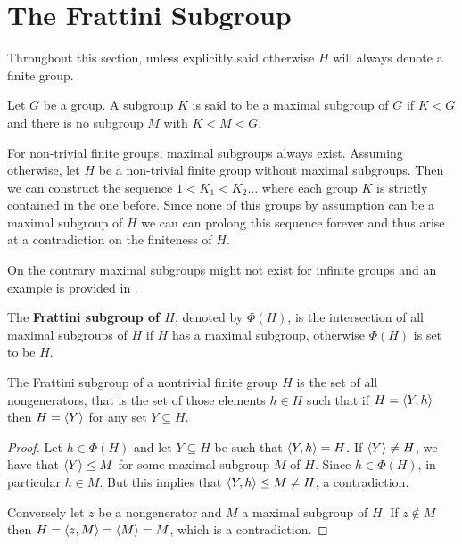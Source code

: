 \section{The Frattini Subgroup}

Throughout this section, unless explicitly said otherwise $H$ will always denote a finite group. 

\begin{definition}
    Let $G$ be a group. A subgroup $K$ is said to be a maximal subgroup of $G$ if $K < G$ and there is no subgroup $M$ with $K < M < G$.
\end{definition}

For non-trivial finite groups, maximal subgroups always exist. Assuming otherwise, let $H$ be a non-trivial finite group without maximal subgroups. Then we can construct the sequence
$1 < K_1 < K_2 \ldots $
where each group $K$ is strictly contained in the one before. Since none of this groups by assumption can be a maximal subgroup of $H$ we can can prolong this sequence forever and thus arise at a contradiction on the finiteness of $H$.

On the contrary maximal subgroups might not exist for infinite groups and an example is provided in \cite[p.~123]{RotmanITG}.

\begin{definition}
    The \textbf{Frattini subgroup of $H$}, denoted by \textbf{$\Phi(H)$}, is the intersection of all maximal subgroups of $H$ if $H$ has a maximal subgroup, otherwise $\Phi(H)$ is set to be $H$. 
\end{definition}

\begin{theorem}
    \cite[p.~123]{RotmanITG}
    The Frattini subgroup of a nontrivial finite group $H$ is the set of all nongenerators, that is the set of those elements $h \in H$ such that if $H = \langle Y, h \rangle$ then $H = \langle Y \rangle$ for any set $Y \subseteq H$.
\end{theorem}

\begin{proof}
    Let $h \in \Phi(H)$ and let $Y \subseteq H$ be such that $\langle Y, h \rangle = H$. If $\langle Y \rangle \ne H$, we have that $\langle Y \rangle \le M$ for some maximal subgroup $M$ of $H$. Since $h \in \Phi(H)$, in particular $h \in M$.  But this implies that $\langle Y,h \rangle \le M \ne H$, a contradiction.

    Conversely let $z$ be a nongenerator and $M$ a maximal subgroup of $H$. If $z \notin M$ then $H = \langle z, M \rangle = \langle M \rangle = M$, which is a contradiction.
\end{proof}

